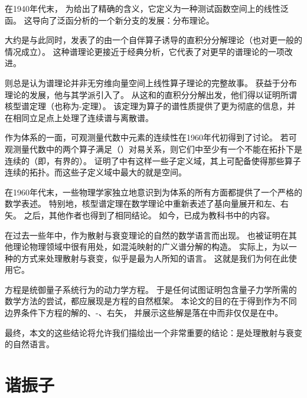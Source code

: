 在1940年代末，%
为\deltafunc 给出了精确的含义，它定义为一种测试函数空间上的线性泛函。
这导向了泛函分析的一个新分支的发展：分布理论。%

大约是与此同时，\neumann 发表了\hs 的由一个自伴算子诱导的直积分分解理论（也对更一般的情况成立）。%
这种谱理论更接近于经典\fourier 分析，它代表了对更早的\neumann 谱理论的一项改进。%

则总是认为\neumann 谱理论并非无穷维向量空间上线性算子理论的完整故事。
获益于分布理论的发展，他与其学派引入了。
从这\rhs 和\neumann 的直积分分解出发，他们得以证明所谓核型谱定理（也称为\gelfand-\maurin 定理）。%
该定理为算子的谱性质提供了更为彻底的信息，并在相同立足点上处理了连续谱与离散谱。

作为\dirac 体系的一面，可观测量代数中元素的连续性在1960年代初得到了讨论。%
若可观测量代数中的两个算子满足\canonical（\heisenberg）对易关系，则它们中至少有一个不能在\hs 拓扑下是连续的（即，有界的）。
证明了\hs 中有这样一些子定义域，其上可配备使得那些算子连续的拓扑。而这些子定义域中最大的就是\schwartz 空间。

在1960年代末，一些物理学家独立地意识到\RHS 为\dirac 体系的所有方面都提供了一个严格的数学表述。%
特别地，核型谱定理在数学理论中重新表述了\dirac 基向量展开和\dirac 左、右矢。
之后，其他作者也得到了相同结论。%
如今，\RHS 已成为教科书中的内容。%

在过去一些年中，\RHS 作为散射与衰变理论的自然的数学语言而出现。%
\RHS 也被证明在其他理论物理领域中很有用处，如混沌映射的广义谱分解的构造。%
实际上，为以一种的方式来处理散射与衰变，\RHS 似乎是最为人所知的语言。
这就是我们为何在此使用它。

\schrodinger 方程是统御量子系统行为的动力学方程。
于是任何试图证明\RHS 包含量子力学所需的数学方法的尝试，都应展现\RHS 是\schrodinger 方程的自然框架。
本论文的目的在于得到作为不同边界条件下\schrodinger 方程的解的\dirac、\lippmann-\schwinger、\gamow 右矢，
并展示这些解是落在\RHS 中而非仅仅是在\HS 中。%

最终，本文的这些结论将允许我们描绘出一个非常重要的结论：\RHS 是处理散射与衰变的自然语言。

\section{谐振子}